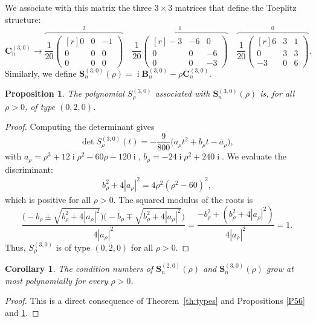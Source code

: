 \documentclass[addpoints,12pt,letter]{article}
\DeclareMathOperator{\mi}{i} %
\newcommand{\ol}{\overline}
\newcommand{\SR}{S}
\numberwithin{equation}{section}
\newtheorem{proposition}[lemma]{Proposition}
\newtheorem{corollary}[lemma]{Corollary}
\theoremstyle{definition}
\begin{document}
We associate with this matrix the three $3\times 3$ matrices that define the Toeplitz structure:
\[
\mathbf{C}_{n}^{(3,0)}\to
\overbrace{\frac{1}{20}\begin{pmatrix}[r]
0 & 0 &-1 \\
0 & 0 & 0 \\
0 & 0 & 0
\end{pmatrix}}^{2}
\quad
\overbrace{\frac{1}{20}\begin{pmatrix}[r]
-3 &-6 & 0 \\
0 & 0 &-6 \\
0 & 0 &-3
\end{pmatrix}}^{1}
\quad
\overbrace{\frac{1}{20}\begin{pmatrix}[r]
6 & 3 & 1 \\
0 & 3 & 3 \\
-3 & 0 & 6
\end{pmatrix}}^{0}.
\]
Similarly, we define $\mathbf{S}_{n}^{(3,0)}(\rho)=\mi\mathbf{B}_{n}^{(3,0)}-\rho\mathbf{C}_{n}^{(3,0)}$.

\begin{proposition}\label{P57}
The polynomial $\SR_{\rho}^{(3,0)}$ associated with $\mathbf{S}_{n}^{(3,0)}(\rho)$ is, for all $\rho>0$, of type $(0,2,0)$.
\end{proposition}

\begin{proof}
Computing the determinant gives
\[
\det \SR_{\rho}^{(3,0)}(t)=-\frac{9}{800}\big(a_{\rho} t^{2}+b_{\rho} t-\ol{a}_{\rho}\big),
\]
with $a_{\rho}=\rho^{3}+12\mi\rho^{2}-60\rho-120\mi$, $b_{\rho}=-24\mi\rho^{2}+240\mi$.
We evaluate the discriminant:
\begin{align*}
b_{\rho}^{2}+4|a_{\rho}|^{2}=4\rho^{2}(\rho^{2}-60)^{2},
\end{align*}
which is positive for all $\rho>0$.
The squared modulus of the roots is
\[
\frac{\Big(-b_{\rho}\pm\sqrt{b_{\rho}^{2}+4|a_{\rho}|^{2}}\Big)\Big(-b_{\rho}\mp\sqrt{b_{\rho}^{2}+4|a_{\rho}|^{2}}\Big)}{4|a_{\rho}|^{2}}
=\frac{-b_{\rho}^{2}+(b_{\rho}^{2}+4|a_{\rho}|^{2})}{4|a_{\rho}|^{2}}=1.
\]
Thus, $\SR_{\rho}^{(3,0)}$ is of type $(0,2,0)$ for all $\rho>0$.
\end{proof}

\begin{corollary} \label{cor:514}
The condition numbers of $\mathbf{S}_{n}^{(2,0)}(\rho)$ and $\mathbf{S}_{n}^{(3,0)}(\rho)$ grow at most polynomially for every $\rho>0$.
\end{corollary}

\begin{proof}
This is a direct consequence of Theorem~\ref{th:types} and Propositions \ref{P56} and \ref{P57}.
\end{proof}
\end{document}
